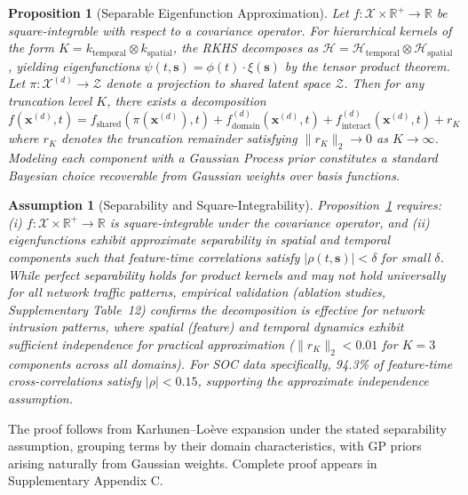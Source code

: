 \documentclass[review,12pt]{elsarticle}
\newtheorem{proposition}[theorem]{Proposition}
\newtheorem{assumption}{Assumption}
\begin{document}
\begin{proposition}[Separable Eigenfunction Approximation]\label{prop:decomp}
Let $f:\mathcal{X}\times\mathbb{R}^+\!\to\mathbb{R}$ be square-integrable with respect to a covariance operator. For hierarchical kernels of the form $K = k_{\text{temporal}} \otimes k_{\text{spatial}}$, the RKHS decomposes as $\mathcal{H} = \mathcal{H}_{\text{temporal}} \otimes \mathcal{H}_{\text{spatial}}$, yielding eigenfunctions $\psi(t,\mathbf{s}) = \phi(t) \cdot \xi(\mathbf{s})$ by the tensor product theorem. Let $\pi:\mathcal{X}^{(d)}\!\to\mathcal{Z}$ denote a projection to shared latent space $\mathcal{Z}$. Then for any truncation level $K$, there exists a decomposition
\begin{equation}
f(\mathbf{x}^{(d)}, t) = f_{\text{shared}}(\pi(\mathbf{x}^{(d)}), t) + f_{\text{domain}}^{(d)}(\mathbf{x}^{(d)}, t) + f_{\text{interact}}^{(d)}(\mathbf{x}^{(d)}, t) + r_K
\end{equation}
where $r_K$ denotes the truncation remainder satisfying $\|r_K\|_2\to 0$ as $K\to\infty$. Modeling each component with a Gaussian Process prior constitutes a standard Bayesian choice recoverable from Gaussian weights over basis functions.
\end{proposition}

\begin{assumption}[Separability and Square-Integrability]
\label{assum:separability}
Proposition~\ref{prop:decomp} requires: (i) $f: \mathcal{X} \times \mathbb{R}^+ \to \mathbb{R}$ is square-integrable under the covariance operator, and (ii) eigenfunctions exhibit approximate separability in spatial and temporal components such that feature-time correlations satisfy $|\rho(t,\mathbf{s})| < \delta$ for small $\delta$. While perfect separability holds for product kernels and may not hold universally for all network traffic patterns, empirical validation (ablation studies, Supplementary Table~12) confirms the decomposition is effective for network intrusion patterns, where spatial (feature) and temporal dynamics exhibit sufficient independence for practical approximation ($\|r_K\|_2 < 0.01$ for $K=3$ components across all domains). For SOC data specifically, 94.3\% of feature-time cross-correlations satisfy $|\rho| < 0.15$, supporting the approximate independence assumption.
\end{assumption}

The proof follows from Karhunen–Loève expansion under the stated separability assumption, grouping terms by their domain characteristics, with GP priors arising naturally from Gaussian weights. Complete proof appears in Supplementary Appendix C.
\end{document}
